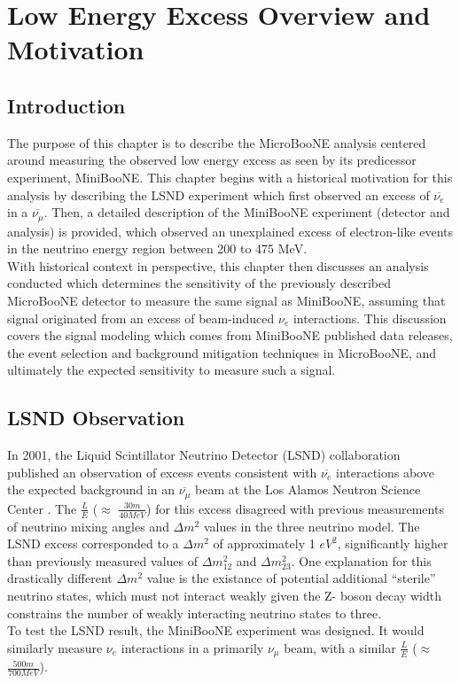 \section{Low Energy Excess Overview and Motivation}
\subsection{Introduction}
The purpose of this chapter is to describe the MicroBooNE analysis centered around measuring the observed low energy excess as seen by its predicessor experiment, MiniBooNE. This chapter begins with a historical motivation for this analysis by describing the LSND experiment which first observed an excess of $\overline{\nu_e}$ in a $\overline{\nu_\mu}$. Then, a detailed description of the MiniBooNE experiment (detector and analysis) is provided, which observed an unexplained excess of electron-like events in the neutrino energy region between 200 to 475 MeV.\\

With historical context in perspective, this chapter then discusses an analysis conducted which determines the sensitivity of the previously described MicroBooNE detector to measure the same signal as MiniBooNE, assuming that signal originated from an excess of beam-induced $\nu_e$ interactions. This discussion covers the signal modeling which comes from MiniBooNE published data releases, the event selection and background mitigation techniques in MicroBooNE, and ultimately the expected sensitivity to measure such a signal.

\subsection{LSND Observation}

In 2001, the Liquid Scintillator Neutrino Detector (LSND) collaboration published an observation of excess events consistent with $\overline{\nu_e}$ interactions above the expected background in an $\overline{\nu_\mu}$ beam at the Los Alamos Neutron Science Center \cite{LSNDPaper}. The $\frac{L}{E}$ ($\approx$ $\frac{30 m}{40 MeV}$) for this excess disagreed with previous measurements of neutrino mixing angles and $\Delta m^2$ values in the three neutrino model. The LSND excess corresponded to a $\Delta m^2$ of approximately 1 $eV^2$, significantly higher than previously measured values of $\Delta m_{12}^2$ and $\Delta m_{23}^2$. One explanation for this drastically different $\Delta m^2$ value is the existance of potential additional ``sterile'' neutrino states, which must not interact weakly given the Z- boson decay width constrains the number of weakly interacting neutrino states to three.\\
To test the LSND result, the MiniBooNE experiment was designed. It would similarly measure $\nu_e$ interactions in a primarily $\nu_\mu$ beam, with a similar $\frac{L}{E}$ ($\approx$ $\frac{500m}{700 MeV}$).



